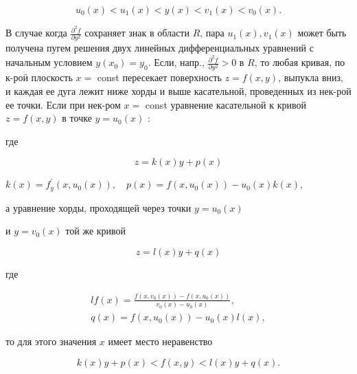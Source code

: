 \documentclass[10pt]{article}
\begin{document}
\[

u_{0}(x)<u_{1}(x)<y(x)<v_{1}(x)<v_{0}(x) .

\]



В случае когда $\frac{\partial^{2} f}{\partial y^{2}}$ сохраняет знак в области $R$, пара $u_{1}(x), v_{1}(x)$ может быть получена пугем решения двух линейных дифференциальных уравнений с начальным условием $y\left(x_{0}\right)=y_{0}$. Если, напр., $\frac{\partial^{2} f}{\partial y^{2}}>0$ в $R$, то любая кривая, по к-роӥ плоскость $x=$ const пересекает поверхность $z=f(x, y)$, выпукла вниз, и каждая ее дуга лежит ниже хорды и выше касательной, проведенных из нек-рой ее точки. Если при нек-ром $x=$ const уравнение касательной к кривой $z=f(x, y)$ в точке $y=u_{0}(x)$ :



где



\[

z=k(x) y+p(x)

\]



$k(x)=f_{y}^{\prime}\left(x, u_{0}(x)\right), \quad p(x)=f\left(x, u_{0}(x)\right)-u_{0}(x) k(x)$,



а уравнение хорды, проходящей через точки $y=u_{0}(x)$



и $y=v_{0}(x)$ той же кривой



\[

z=l(x) y+q(x)

\]



где



\[

\begin{gathered}

l f(x)=\frac{f\left(x, v_{0}(x)\right)-f\left(x, u_{0}(x)\right)}{v_{0}(x)-u_{0}(x)}, \\

q(x)=f\left(x, u_{0}(x)\right)-u_{0}(x) l(x),

\end{gathered}

\]



то для этого значения $x$ имеет место неравенство



\[

k(x) y+p(x)<f(x, y)<l(x) y+q(x) .

\]
\end{document}
